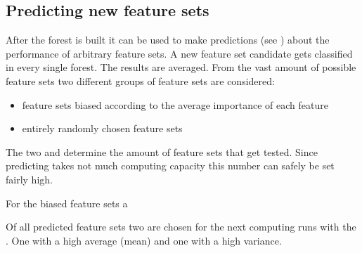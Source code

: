 \documentclass[letterpaper,10pt,english]{sphinxmanual}
\begin{document}
\subsection{Predicting new feature sets}
\label{\detokenize{RF:predicting-new-feature-sets}}
After the forest is built it can be used to make predictions (see {\hyperref[\detokenize{RF:forest-predict}]{}}) about the performance of arbitrary feature sets.
A new feature set candidate gets classified in every single forest.
The results are averaged.
From the vast amount of possible feature sets two different groups of feature sets are considered:
\begin{itemize}
\item {} 
feature sets biased according to the average importance of each feature

\item {} 
entirely randomly chosen feature sets

\end{itemize}

The two {\hyperref[\detokenize{execution:hyperparameters}]{}}  and  determine the amount of feature sets that get tested.
Since predicting takes not much computing capacity this number can safely be set fairly high.

For the biased feature sets a

Of all predicted feature sets two are chosen for the next computing runs with the {\hyperref[\detokenize{Overview:mla}]{}}. One with a high average (mean) and one with a high variance.
\end{document}

